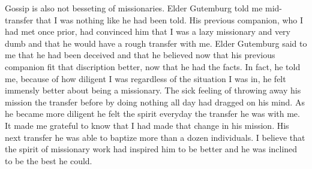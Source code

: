 \begin{entry}
{Gossip is also not besseting of missionaries.  Elder Gutemburg told me mid-transfer that I was nothing like he had been told.  His previous companion, who I had met once prior, had convinced him that I was a lazy missionary and very dumb and that he would have a rough transfer with me.  Elder Gutemburg said to me that he had been deceived and that he believed now that his previous companion fit that discription better, now that he had the facts.  In fact, he told me, because of how diligent I was regardless of the situation I was in, he felt immensly better about being a missionary.  The sick feeling of throwing away his mission the transfer before by doing nothing all day had dragged on his mind.  As he became more diligent he felt the spirit everyday the transfer he was with me.  It made me grateful to know that I had made that change in his mission.  His next transfer he was able to baptize more than a dozen individuals.  I believe that the spirit of missionary work had inspired him to be better and he was inclined to be the best he could.  
}
\end{entry}

\begin{entry}
\date{10-11th Transfers, Quebec, Londrina, Paran\'a}

\end{entry}

